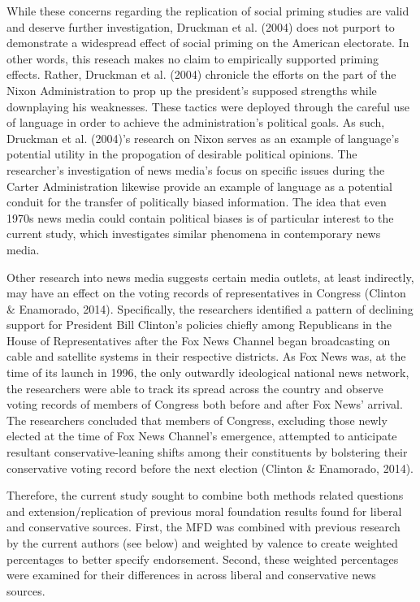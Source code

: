 \documentclass[,man]{apa6}
\begin{document}
While these concerns regarding the replication of social priming studies
are valid and deserve further investigation, Druckman et al. (2004) does
not purport to demonstrate a widespread effect of social priming on the
American electorate. In other words, this reseach makes no claim to
empirically supported priming effects. Rather, Druckman et al. (2004)
chronicle the efforts on the part of the Nixon Administration to prop up
the president's supposed strengths while downplaying his weaknesses.
These tactics were deployed through the careful use of language in order
to achieve the administration's political goals. As such, Druckman et
al. (2004)'s research on Nixon serves as an example of language's
potential utility in the propogation of desirable political opinions.
The researcher's investigation of news media's focus on specific issues
during the Carter Administration likewise provide an example of language
as a potential conduit for the transfer of politically biased
information. The idea that even 1970s news media could contain political
biases is of particular interest to the current study, which
investigates similar phenomena in contemporary news media.

Other research into news media suggests certain media outlets, at least
indirectly, may have an effect on the voting records of representatives
in Congress (Clinton \& Enamorado, 2014). Specifically, the researchers
identified a pattern of declining support for President Bill Clinton's
policies chiefly among Republicans in the House of Representatives after
the Fox News Channel began broadcasting on cable and satellite systems
in their respective districts. As Fox News was, at the time of its
launch in 1996, the only outwardly ideological national news network,
the researchers were able to track its spread across the country and
observe voting records of members of Congress both before and after Fox
News' arrival. The researchers concluded that members of Congress,
excluding those newly elected at the time of Fox News Channel's
emergence, attempted to anticipate resultant conservative-leaning shifts
among their constituents by bolstering their conservative voting record
before the next election (Clinton \& Enamorado, 2014).

Therefore, the current study sought to combine both methods related
questions and extension/replication of previous moral foundation results
found for liberal and conservative sources. First, the MFD was combined
with previous research by the current authors (see below) and weighted
by valence to create weighted percentages to better specify endorsement.
Second, these weighted percentages were examined for their differences
in across liberal and conservative news sources.
\end{document}
